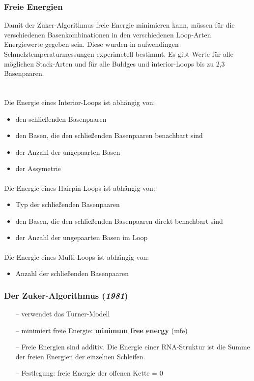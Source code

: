 \subsubsection{Freie Energien}
Damit der Zuker-Algorithmus freie Energie minimieren kann, m\"ussen f\"ur die verschiedenen Basenkombinationen in den verschiedenen Loop-Arten Energiewerte gegeben sein. Diese wurden in aufwendingen Schmelztemperaturmessungen experimetell bestimmt. Es gibt Werte für alle m\"oglichen Stack-Arten und f\"ur alle Buldges und interior-Loops bis zu 2,3 Basenpaaren.\\\\
\paragraph{}
Die Energie eines Interior-Loops ist abh\"angig von:
\begin{itemize}
	\item den schließenden Basenpaaren
	\item den Basen, die den schließenden Basenpaaren benachbart sind
	\item der Anzahl der ungepaarten Basen
	\item der Assymetrie
\end{itemize}
\paragraph{}
Die Energie eines Hairpin-Loops ist abh\"angig von:
\begin{itemize}
	\item Typ der schließenden Basenpaaren
	\item den Basen, die den schließenden Basenpaaren direkt benachbart sind
	\item der Anzahl der ungepaarten Basen im Loop
\end{itemize}
\paragraph{}
Die Energie eines Multi-Loops ist abh\"angig von:
\begin{itemize}
	\item Anzahl der schließenden Basenpaaren
\end{itemize}

\subsubsection{Der Zuker-Algorithmus (\textit{1981})}
\begin{itemize}
\item[--]verwendet das Turner-Modell
\item[--]minimiert freie Energie: \textbf{minimum free energy} (mfe)
\item[--]Freie Energien sind additiv. Die Energie einer RNA-Struktur ist die Summe der freien Energien der einzelnen Schleifen.
\item[--]Festlegung: freie Energie der offenen Kette = 0
\end{itemize}
